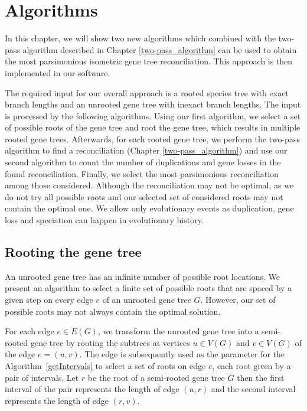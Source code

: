 \chapter{Algorithms} \label{Algorithms}

In this chapter, we will show two new algorithms which combined with the two-pass algorithm described in Chapter \ref{two-pass_algorithm} \cite{chladek_thesis} can be used to obtain the most parsimonious isometric gene tree reconciliation. This approach is then implemented in our software.

The required input for our overall approach is a rooted species tree with exact branch lengths and an unrooted gene tree with inexact branch lengths. The input is processed by the following algorithms. Using our first algorithm, we select a set of possible roots of the gene tree and root the gene tree, which results in multiple rooted gene trees. Afterwards, for each rooted gene tree, we perform the two-pass algorithm to find a reconciliation  (Chapter \ref{two-pass_algorithm}) and use our second algorithm to count the number of duplications and gene losses in the found reconciliation. Finally, we select the most parsimonious reconciliation among those considered. Although the reconciliation may not be optimal, as we do not try all possible roots and our selected set of considered roots may not contain the optimal one. We allow only evolutionary events as duplication, gene loss and speciation can happen in evolutionary history.

\section{Rooting the gene tree} \label{rooting_the_gene_tree}

An unrooted gene tree has an infinite number of possible root locations. We present an algorithm to select a finite set of possible roots that are spaced by a given step on every edge $e$ of an unrooted gene tree $G$. However, our set of possible roots may not always contain the optimal solution. 

For each edge $e \in E(G)$, we transform the unrooted gene tree into a semi-rooted gene tree by rooting the subtrees at vertices $u \in V(G)$ and $v \in V(G)$ of the edge $e = (u, v)$. The edge is subsequently used as the parameter for the Algorithm~\ref{getIntervals} to select a set of roots on edge $e$, each root given by a pair of intervals. Let $r$ be the root of a semi-rooted gene tree $G$ then the first interval of the pair represents the length of edge $(u, r)$ and the second interval represents the length of edge $(r, v)$.

